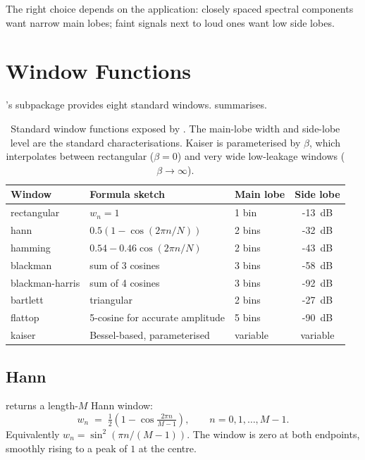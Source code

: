 The right choice depends on the application: closely spaced
spectral components want narrow main lobes; faint signals next to
loud ones want low side lobes.

\section{Window Functions}
\label{sec:signal_windows:functions}

\Lucid's  subpackage provides eight
standard windows.  summarises.

\begin{table}[t]
\centering
\small
\begin{tabular}{lllc}
\toprule
Window & Formula sketch & Main lobe & Side lobe \\
\midrule
rectangular  & $w_n = 1$                       & 1 bin   & -13~dB \\
hann         & $0.5 (1 - \cos(2\pi n/N))$     & 2 bins  & -32~dB \\
hamming      & $0.54 - 0.46 \cos(2\pi n/N)$   & 2 bins  & -43~dB \\
blackman     & sum of 3 cosines               & 3 bins  & -58~dB \\
blackman-harris & sum of 4 cosines            & 3 bins  & -92~dB \\
bartlett     & triangular                     & 2 bins  & -27~dB \\
flattop      & 5-cosine for accurate amplitude & 5 bins & -90~dB \\
kaiser       & Bessel-based, parameterised    & variable & variable \\
\bottomrule
\end{tabular}
\caption[Window function catalogue.]{Standard window functions
exposed by . The main-lobe width and
side-lobe level are the standard characterisations. Kaiser is
parameterised by $\beta$, which interpolates between
rectangular ($\beta = 0$) and very wide low-leakage windows
($\beta \to \infty$).}
\label{tab:signal_windows:catalog}
\end{table}

\subsection{Hann}
\label{ssec:signal_windows:hann}

 returns a length-$M$ Hann window:
\[
w_n \;=\; \tfrac{1}{2}\left(1 - \cos \tfrac{2\pi n}{M - 1}\right),
\qquad n = 0, 1, \ldots, M-1.
\]
Equivalently $w_n = \sin^2(\pi n / (M-1))$. The window is zero at
both endpoints, smoothly rising to a peak of $1$ at the centre.


